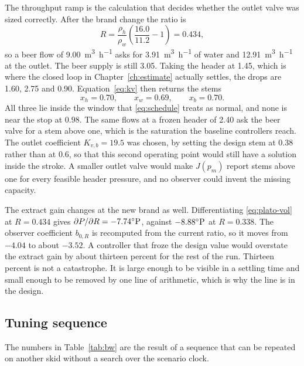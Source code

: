 The throughput ramp is the calculation that decides whether the outlet valve was sized correctly. After the brand change the ratio is
\begin{equation}
R = \frac{\rho_h}{\rho_w}\left(\frac{16.0}{11.2}-1\right) = 0.434,
\end{equation}
so a beer flow of \SI{9.00}{\cubic\metre\per\hour} asks for \SI{3.91}{\cubic\metre\per\hour} of water and \SI{12.91}{\cubic\metre\per\hour} at the outlet. The beer supply is still \SI{3.05}{\barg}. Taking the header at \SI{1.45}{\barg}, which is where the closed loop in Chapter~\ref{ch:estimate} actually settles, the drops are \SI{1.60}{\barg}, \SI{2.75}{\barg} and \SI{0.90}{\barg}. Equation~\eqref{eq:kv} then returns the stems
\begin{equation}
x_h = 0.70, \qquad x_w = 0.69, \qquad x_b = 0.70.
\end{equation}
All three lie inside the window that \eqref{eq:schedule} treats as normal, and none is near the stop at $0.98$. The same flows at a frozen header of \SI{2.40}{\barg} ask the beer valve for a stem above one, which is the saturation the baseline controllers reach. The outlet coefficient $K_{v,b}=19.5$ was chosen, by setting the design stem at $0.38$ rather than at $0.6$, so that this second operating point would still have a solution inside the stroke. A smaller outlet valve would make $J(p_m)$ report stems above one for every feasible header pressure, and no observer could invent the missing capacity.

The extract gain changes at the new brand as well. Differentiating \eqref{eq:plato-vol} at $R=0.434$ gives $\partial P/\partial R = -7.74^{\circ}\mathrm{P}$, against $-8.88^{\circ}\mathrm{P}$ at $R=0.338$. The observer coefficient $b_{0,R}$ is recomputed from the current ratio, so it moves from $-4.04$ to about $-3.52$. A controller that froze the design value would overstate the extract gain by about thirteen percent for the rest of the run. Thirteen percent is not a catastrophe. It is large enough to be visible in a settling time and small enough to be removed by one line of arithmetic, which is why the line is in the design.

\subsection{Tuning sequence}

The numbers in Table~\ref{tab:bw} are the result of a sequence that can be repeated on another skid without a search over the scenario clock.

